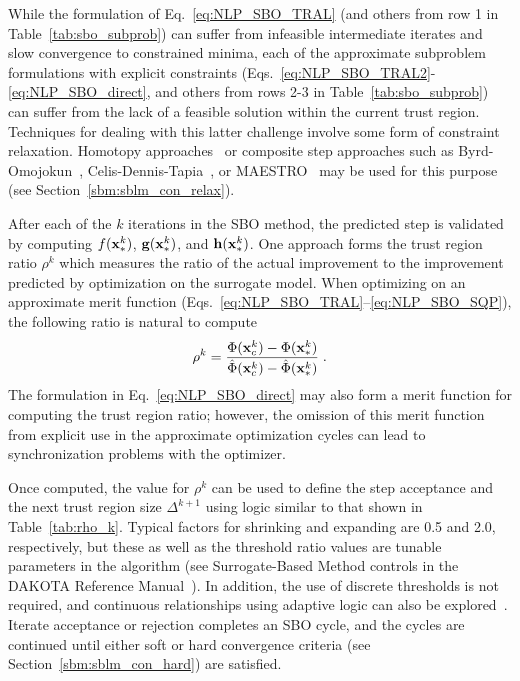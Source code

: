 While the formulation of Eq.~\ref{eq:NLP_SBO_TRAL} (and others from
row 1 in Table~\ref{tab:sbo_subprob}) can suffer from infeasible
intermediate iterates and slow convergence to constrained minima, each
of the approximate subproblem formulations with explicit constraints
(Eqs.~\ref{eq:NLP_SBO_TRAL2}-\ref{eq:NLP_SBO_direct}, and others from
rows 2-3 in Table~\ref{tab:sbo_subprob}) can suffer from the lack of a
feasible solution within the current trust region.  Techniques for
dealing with this latter challenge involve some form of constraint
relaxation.  Homotopy approaches~\cite{Per04a,Per04b} or composite
step approaches such as Byrd-Omojokun~\cite{Omo89},
Celis-Dennis-Tapia~\cite{Cel85}, or MAESTRO~\cite{Ale00} may be used
for this purpose (see Section~\ref{sbm:sblm_con_relax}).

After each of the $k$ iterations in the SBO method, the predicted
step is validated by computing $f({\bf x}^k_\ast)$,
${\bf g}({\bf x}^k_\ast)$, and ${\bf h}({\bf x}^k_\ast)$.  One
approach forms the trust region ratio $\rho^k$ which measures the
ratio of the actual improvement to the improvement predicted by
optimization on the surrogate model.  When optimizing on an approximate 
merit function (Eqs.~\ref{eq:NLP_SBO_TRAL}--\ref{eq:NLP_SBO_SQP}), the 
following ratio is natural to compute
\begin{equation}
\rho^k = \frac{     \Phi({\bf x}^k_c)      - \Phi({\bf x}^k_\ast)}
	      {\hat \Phi({\bf x}^k_c) - \hat \Phi({\bf x}^k_\ast)} \; .
\label{eq:rho_phi_k}
\end{equation}
The formulation in Eq.~\ref{eq:NLP_SBO_direct} may also form a merit
function for computing the trust region ratio; however, the omission
of this merit function from explicit use in the approximate
optimization cycles can lead to synchronization problems with the
optimizer.  %

Once computed, the value for $\rho^k$ can be used to define the step
acceptance and the next trust region size $\Delta^{k+1}$ using logic
similar to that shown in Table~\ref{tab:rho_k}.  Typical factors for
shrinking and expanding are 0.5 and 2.0, respectively, but these as
well as the threshold ratio values are tunable parameters in the
algorithm (see Surrogate-Based Method controls in the DAKOTA Reference
Manual~\cite{RefMan}).  In addition, the use of discrete thresholds is
not required, and continuous relationships using adaptive logic can
also be explored~\cite{Wuj98a,Wuj98b}.  Iterate acceptance or
rejection completes an SBO cycle, and the cycles are continued until
either soft or hard convergence criteria (see
Section~\ref{sbm:sblm_con_hard}) are satisfied.

